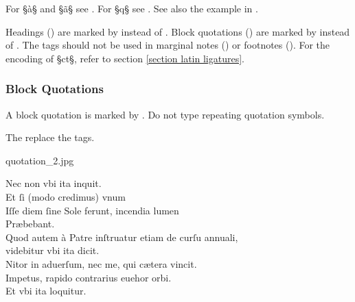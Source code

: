 \begin{crossref}
For §à§ and §ã§ see . For  §\´q§ see . See also the example in .
\end{crossref}

\begin{note}
Headings () are marked by  instead of . Block quotations  () are marked by  instead of . The  tags should not be used in marginal notes () or footnotes (). For the encoding of §ct§, refer to section \ref{section latin ligatures}.
\end{note}


\subsubsection{Block Quotations}
\label{section block quotations}

\begin{mainrule}
A block quotation is marked by . Do not type repeating quotation symbols.
\end{mainrule}

\begin{clarification}
The  replace the  tags.
\end{clarification}

\begin{sampleImage}{quotation_2.jpg}
\begin{typeLatin}
Nec non vbi ita inquit.\\
Et ſi (modo credimus) vnum \\
Iſſe diem ſine Sole ferunt, incendia lumen \\
Præbebant.\\
Quod autem à Patre inſtruatur etiam de curſu annuali, \\
videbitur vbi ita dicit.\\
Nitor in aduerſum, nec me, qui cætera vincit. \\
Impetus,  rapido contrarius euehor orbi. \\
Et vbi ita loquitur.
\end{typeLatin}
\end{sampleImage}

